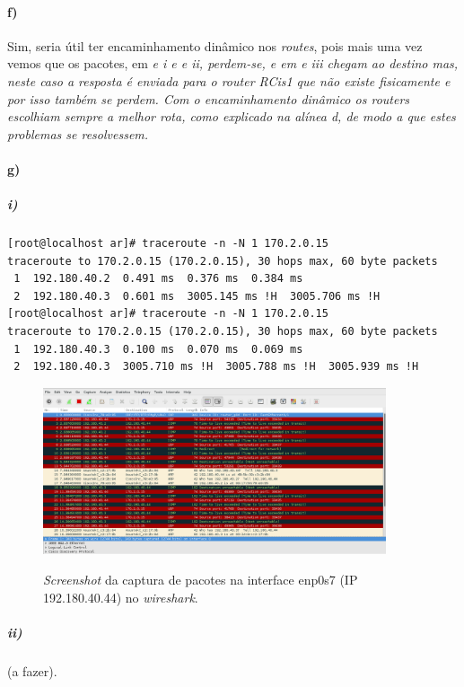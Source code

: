 \paragraph{f)}
Sim, seria útil ter encaminhamento dinâmico nos \emph{routes}, pois mais uma vez vemos que os pacotes, em \it{e i} e \it{e ii}, perdem-se, e em \it{e iii} chegam ao destino mas, neste caso a resposta é enviada para o \emph{router} \textsf{RCis1} que não existe fisicamente e por isso também se perdem. Com o encaminhamento dinâmico os \emph{routers} escolhiam sempre a melhor rota, como explicado na alínea \it{d}, de modo a que estes problemas se resolvessem.

\paragraph{g)}
\subparagraph{i)}
\begin{verbatim}
[root@localhost ar]# traceroute -n -N 1 170.2.0.15
traceroute to 170.2.0.15 (170.2.0.15), 30 hops max, 60 byte packets
 1  192.180.40.2  0.491 ms  0.376 ms  0.384 ms
 2  192.180.40.3  0.601 ms  3005.145 ms !H  3005.706 ms !H
[root@localhost ar]# traceroute -n -N 1 170.2.0.15
traceroute to 170.2.0.15 (170.2.0.15), 30 hops max, 60 byte packets
 1  192.180.40.3  0.100 ms  0.070 ms  0.069 ms
 2  192.180.40.3  3005.710 ms !H  3005.788 ms !H  3005.939 ms !H
\end{verbatim}

\begin{figure}[h]
\centering
\includegraphics[width=0.9\textwidth, height=0.35\textheight]{1_g1_screenshot.png}
\label{fig:wireshark-enp0s7}
\caption{\emph{Screenshot} da captura de pacotes na interface enp0s7 (IP 192.180.40.44) no \emph{wireshark}.}
\end{figure}
\newpage
\subparagraph{ii)}
(a fazer).
